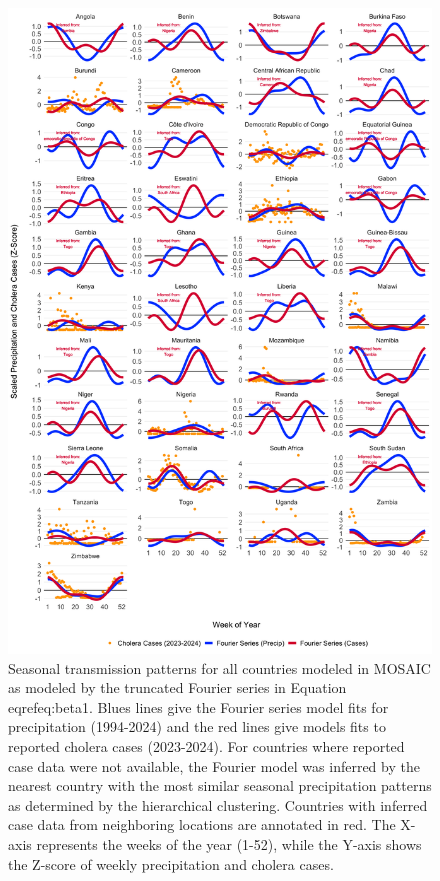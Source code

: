 \documentclass[
]{book}
\begin{document}
\begin{figure}

{\centering \includegraphics[width=1\linewidth]{figures/seasonal_transmission_all} 

}

\caption{Seasonal transmission patterns for all countries modeled in MOSAIC as modeled by the truncated Fourier series in Equation \\eqref{eq:beta1}. Blues lines give the Fourier series model fits for precipitation (1994-2024) and the red lines give models fits to reported cholera cases (2023-2024). For countries where reported case data were not available, the Fourier model was inferred by the nearest country with the most similar seasonal precipitation patterns as determined by the hierarchical clustering. Countries with inferred case data from neighboring locations are annotated in red. The X-axis represents the weeks of the year (1-52), while the Y-axis shows the Z-score of weekly precipitation and cholera cases.}\label{fig:seasonal-all}
\end{figure}
\end{document}
